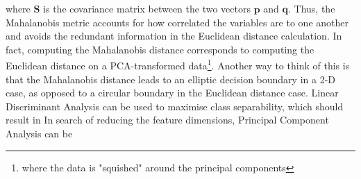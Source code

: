 \documentclass[10pt,twocolumn,letterpaper]{article}
\begin{document}
where $\textbf{S}$ is the covariance matrix between the two vectors $\textbf{p}$ and $\textbf{q}$. Thus, the Mahalanobis metric accounts for how correlated the variables are to one another and avoids the redundant information in the Euclidean distance calculation. In fact, computing the Mahalanobis distance corresponds to computing the Euclidean distance on a PCA-transformed data\footnote{where the data is "squished" around the principal components}. Another way to think of this is that the Mahalanobis distance leads to an elliptic decision boundary in a 2-D case, as opposed to a circular boundary in the Euclidean distance case.
Linear Discriminant Analysis can be used to maximise class separability, which should result in 
In search of reducing the feature dimensions, Principal Component Analysis can be


\begin{thebibliography}{9}



\end{thebibliography}

{\small


}
\end{document}
